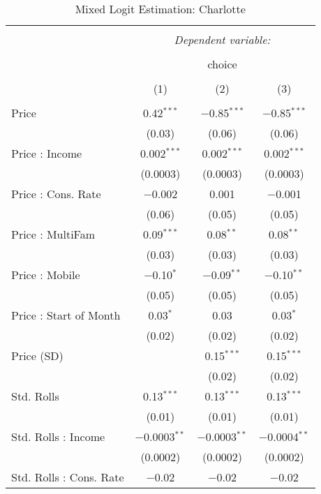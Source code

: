 
\begin{table}[!htbp] \centering 
  \caption{Mixed Logit Estimation: Charlotte} 
  \label{tab:mnlCharlotteRandCoef} 
\begin{tabular}{@{\extracolsep{5pt}}lccc} 
\\[-1.8ex]\hline 
\hline \\[-1.8ex] 
 & \multicolumn{3}{c}{\textit{Dependent variable:}} \\ 
\cline{2-4} 
\\[-1.8ex] & \multicolumn{3}{c}{choice} \\ 
\\[-1.8ex] & (1) & (2) & (3)\\ 
\hline \\[-1.8ex] 
 Price & 0.42$^{***}$ & $-$0.85$^{***}$ & $-$0.85$^{***}$ \\ 
  & (0.03) & (0.06) & (0.06) \\ 
  Price : Income & 0.002$^{***}$ & 0.002$^{***}$ & 0.002$^{***}$ \\ 
  & (0.0003) & (0.0003) & (0.0003) \\ 
  Price : Cons. Rate & $-$0.002 & 0.001 & $-$0.001 \\ 
  & (0.06) & (0.05) & (0.05) \\ 
  Price : MultiFam & 0.09$^{***}$ & 0.08$^{**}$ & 0.08$^{**}$ \\ 
  & (0.03) & (0.03) & (0.03) \\ 
  Price : Mobile & $-$0.10$^{*}$ & $-$0.09$^{**}$ & $-$0.10$^{**}$ \\ 
  & (0.05) & (0.05) & (0.05) \\ 
  Price : Start of Month & 0.03$^{*}$ & 0.03 & 0.03$^{*}$ \\ 
  & (0.02) & (0.02) & (0.02) \\ 
  Price (SD) &  & 0.15$^{***}$ & 0.15$^{***}$ \\ 
  &  & (0.02) & (0.02) \\ 
  Std. Rolls & 0.13$^{***}$ & 0.13$^{***}$ & 0.13$^{***}$ \\ 
  & (0.01) & (0.01) & (0.01) \\ 
  Std. Rolls : Income & $-$0.0003$^{**}$ & $-$0.0003$^{**}$ & $-$0.0004$^{**}$ \\ 
  & (0.0002) & (0.0002) & (0.0002) \\ 
  Std. Rolls : Cons. Rate & $-$0.02 & $-$0.02 & $-$0.02 \\ 

\end{tabular}
\end{table}
